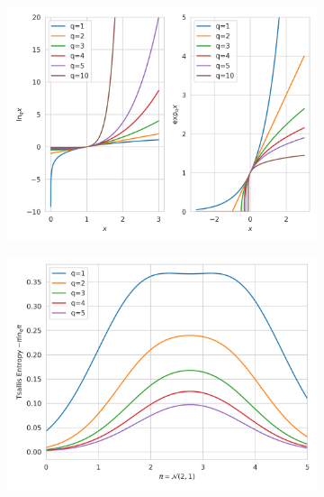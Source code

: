 \documentclass{article}
\begin{document}
\begin{figure}
    \centering
    \begin{subfigure}[b]{0.3\textwidth}
        \includegraphics[width=\textwidth]{img/q_stat_illus.png}
    \end{subfigure}
    \begin{subfigure}[b]{0.3\textwidth}
        \includegraphics[width=\textwidth]{img/tsallis_entropy.png}
    \end{subfigure}
    \begin{subfigure}[b]{0.3\textwidth}

\end{subfigure}
\end{figure}
\end{document}
